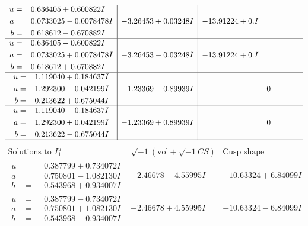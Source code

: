 \documentclass[1p]{elsarticle_modified}
\theoremstyle{definition}
\newcommand{\I}{\sqrt{-1}}
\begin{document}
$$\begin{array}{c|c|c}
\begin{aligned}
u &= \phantom{-}0.636405 + 0.600822 I \\
a &= \phantom{-}0.0733025 - 0.0078478 I \\
b &= \phantom{-}0.618612 - 0.670882 I\end{aligned}
 & -3.26453 + 0.03248 I & -13.91224 + 0. I\phantom{ +0.000000I} \\ \hline\begin{aligned}
u &= \phantom{-}0.636405 - 0.600822 I \\
a &= \phantom{-}0.0733025 + 0.0078478 I \\
b &= \phantom{-}0.618612 + 0.670882 I\end{aligned}
 & -3.26453 - 0.03248 I & -13.91224 + 0. I\phantom{ +0.000000I} \\ \hline\begin{aligned}
u &= \phantom{-}1.119040 + 0.184637 I \\
a &= \phantom{-}1.292300 - 0.042199 I \\
b &= \phantom{-}0.213622 + 0.675044 I\end{aligned}
 & -1.23369 - 0.89939 I & \phantom{-0.000000 } 0 \\ \hline\begin{aligned}
u &= \phantom{-}1.119040 - 0.184637 I \\
a &= \phantom{-}1.292300 + 0.042199 I \\
b &= \phantom{-}0.213622 - 0.675044 I\end{aligned}
 & -1.23369 + 0.89939 I & \phantom{-0.000000 } 0\\
 \hline 
 \end{array}$$\newpage$$\begin{array}{c|c|c}  
\text{Solutions to }I^u_{1}& \I (\text{vol} + \sqrt{-1}CS) & \text{Cusp shape}\\
 \hline 
\begin{aligned}
u &= \phantom{-}0.387799 + 0.734072 I \\
a &= \phantom{-}0.750801 - 1.082130 I \\
b &= \phantom{-}0.543968 + 0.934007 I\end{aligned}
 & -2.46678 - 4.55995 I & -10.63324 + 6.84099 I \\ \hline\begin{aligned}
u &= \phantom{-}0.387799 - 0.734072 I \\
a &= \phantom{-}0.750801 + 1.082130 I \\
b &= \phantom{-}0.543968 - 0.934007 I\end{aligned}
 & -2.46678 + 4.55995 I & -10.63324 - 6.84099 I \\ \hline\begin{aligned}

\end{aligned}
\end{array}$$
\end{document}
